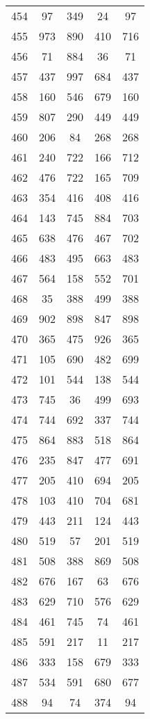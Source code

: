 \documentclass[a4paper,10pt,ngerman]{scrartcl}
\begin{document}
\begin{longtable}[c]{c|c|c|c|c}
    454 & 97 & 349 & 24 & 97 \\
    455 & 973 & 890 & 410 & 716 \\
    456 & 71 & 884 & 36 & 71 \\
    457 & 437 & 997 & 684 & 437 \\
    458 & 160 & 546 & 679 & 160 \\
    459 & 807 & 290 & 449 & 449 \\
    460 & 206 & 84 & 268 & 268 \\
    461 & 240 & 722 & 166 & 712 \\
    462 & 476 & 722 & 165 & 709 \\
    463 & 354 & 416 & 408 & 416 \\
    464 & 143 & 745 & 884 & 703 \\
    465 & 638 & 476 & 467 & 702 \\
    466 & 483 & 495 & 663 & 483 \\
    467 & 564 & 158 & 552 & 701 \\
    468 & 35 & 388 & 499 & 388 \\
    469 & 902 & 898 & 847 & 898 \\
    470 & 365 & 475 & 926 & 365 \\
    471 & 105 & 690 & 482 & 699 \\
    472 & 101 & 544 & 138 & 544 \\
    473 & 745 & 36 & 499 & 693 \\
    474 & 744 & 692 & 337 & 744 \\
    475 & 864 & 883 & 518 & 864 \\
    476 & 235 & 847 & 477 & 691 \\
    477 & 205 & 410 & 694 & 205 \\
    478 & 103 & 410 & 704 & 681 \\
    479 & 443 & 211 & 124 & 443 \\
    480 & 519 & 57 & 201 & 519 \\
    481 & 508 & 388 & 869 & 508 \\
    482 & 676 & 167 & 63 & 676 \\
    483 & 629 & 710 & 576 & 629 \\
    484 & 461 & 745 & 74 & 461 \\
    485 & 591 & 217 & 11 & 217 \\
    486 & 333 & 158 & 679 & 333 \\
    487 & 534 & 591 & 680 & 677 \\
    488 & 94 & 74 & 374 & 94 \\

\end{longtable}
\end{document}
